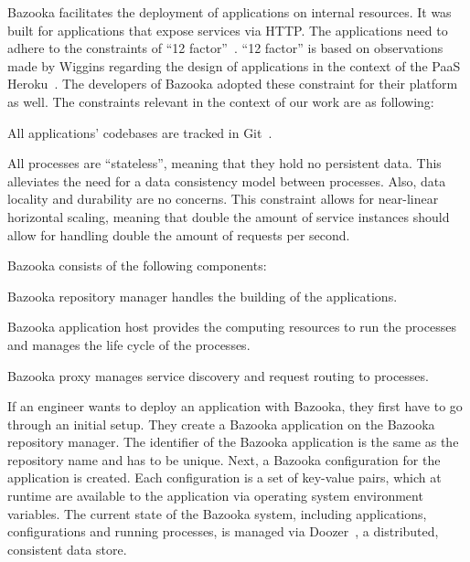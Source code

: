 Bazooka facilitates the deployment of applications on internal resources. It was built for applications that expose services via HTTP. The applications need to adhere to the constraints of ``12 factor''~\cite{12factor}. ``12 factor'' is based on observations made by Wiggins regarding the design of applications in the context of the PaaS Heroku~\cite{heroku}. The developers of Bazooka adopted these constraint for their platform as well. The constraints relevant in the context of our work are as following:
\begin{titemize}
  \item All applications' codebases are tracked in Git~\cite{ProGit}.
  \item All processes are ``stateless'', meaning that they hold no persistent data. This alleviates the need for a data consistency model between processes. Also, data locality and durability are no concerns. This constraint allows for near-linear horizontal scaling, meaning that double the amount of service instances should allow for handling double the amount of requests per second.
\end{titemize}

Bazooka consists of the following components:
\begin{tdescription}
  \item[Bazooka repository manager] handles the building of the applications.
  \item[Bazooka application host] provides the computing resources to run the processes and manages the life cycle of the processes.
  \item[Bazooka proxy] manages service discovery and request routing to processes.
\end{tdescription}

If an engineer wants to deploy an application with Bazooka, they first have to go through an initial setup. They create a Bazooka application on the Bazooka repository manager. The identifier of the Bazooka application is the same as the repository name and has to be unique. Next, a Bazooka configuration for the application is created. Each configuration is a set of key-value pairs, which at runtime are available to the application via operating system environment variables. The current state of the Bazooka system, including applications, configurations and running processes, is managed via Doozer~\cite{Doozer}, a distributed, consistent data store.

